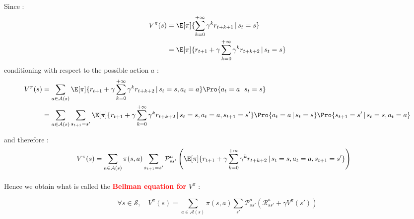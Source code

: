 \documentclass[a4paper]{article}
\begin{document}
{{			\paragraph{} Since : 
			\begin{equation}
				\begin{aligned}
					V^\pi(s) &= \E[\pi]{\sum_{k=0}^{+\infty} \gamma^kr_{t+k+1} \, \vert \, s_t=s} \\
						     &= \E[\pi]{ r_{t+1} + \gamma \sum_{k=0}^{+\infty} \gamma^kr_{t+k+2}  \, \vert \, s_t=s}
				\end{aligned}
			\end{equation}
			conditioning with respect to the possible action $a$ : 
			\begin{equation}
				\begin{aligned}
					V^\pi(s) &= \sum_{a\in\mathcal{A}(s)} \E[\pi]{ r_{t+1} + \gamma \sum_{k=0}^{+\infty} \gamma^kr_{t+k+2}  \, \vert \, s_t=s, a_t = a} \Pro{ a_t =a \, \vert \, s_t =s} \\
						    &= \sum_{a\in\mathcal{A}(s)}\sum_{s_{t+1}=s'} \E[\pi]{ r_{t+1} + \gamma \sum_{k=0}^{+\infty} \gamma^kr_{t+k+2}  \, \vert \, s_t=s, a_t = a, s_{t+1}=s'} \Pro{ a_t =a \, \vert \, s_t =s}\Pro{ s_{t+1}=s' \, \vert \, s_t =s, a_t = a} 
				\end{aligned}
			\end{equation}
			
			and therefore :
			\begin{equation}
				\begin{aligned}
					V^\pi(s) &= \sum_{a\in\mathcal{A}(s)} \pi(s,a) \sum_{s_{t+1}=s'} \mathcal{P}_{ss'}^a \left( \E[\pi]{r_{t+1} + \gamma \sum_{k=0}^{+\infty} \gamma^kr_{t+k+2}  \, \vert \, s_t=s, a_t = a, s_{t+1}=s'}\right)
				\end{aligned}
			\end{equation}
			
			\paragraph{} Hence we obtain what is called the \textbf{\textcolor{red}{Bellman equation for}} $V^\pi$ : 
			\vspace{10pt}
			
			{
				\begin{equation}
					\forall{s}\in\mathcal{S}, \quad V^\pi(s) = \sum_{a\in \mathcal{A}(s)} \pi(s,a) \sum_{s'} \mathcal{P}_{ss'}^a \left( \mathcal{R}_{ss'}^a + \gamma V^\pi(s')\right)
				\end{equation}
			}
			
}}
\end{document}
